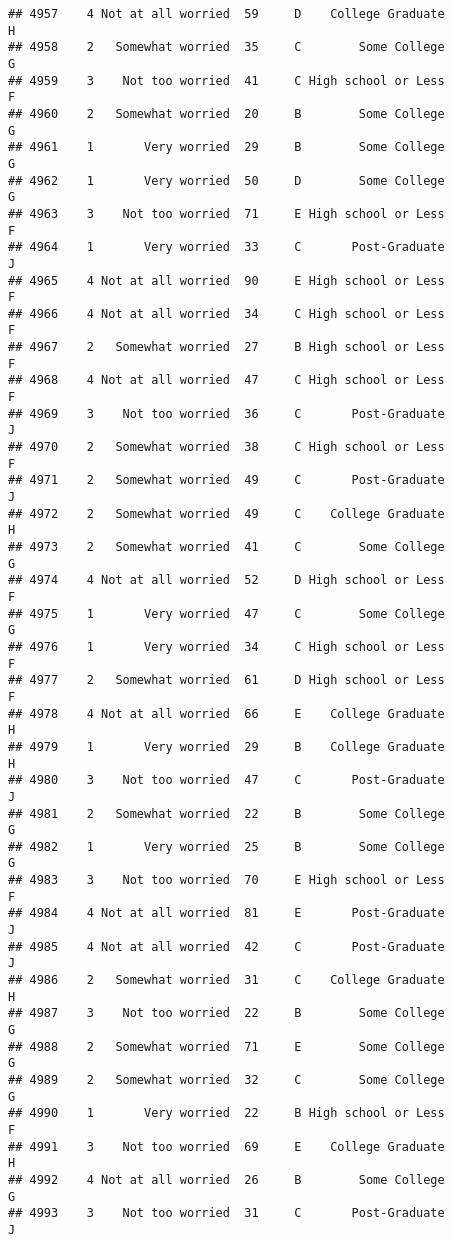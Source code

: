 \documentclass[
]{article}
\begin{document}
\begin{verbatim}
## 4957    4 Not at all worried  59     D    College Graduate         H
## 4958    2   Somewhat worried  35     C        Some College         G
## 4959    3    Not too worried  41     C High school or Less         F
## 4960    2   Somewhat worried  20     B        Some College         G
## 4961    1       Very worried  29     B        Some College         G
## 4962    1       Very worried  50     D        Some College         G
## 4963    3    Not too worried  71     E High school or Less         F
## 4964    1       Very worried  33     C       Post-Graduate         J
## 4965    4 Not at all worried  90     E High school or Less         F
## 4966    4 Not at all worried  34     C High school or Less         F
## 4967    2   Somewhat worried  27     B High school or Less         F
## 4968    4 Not at all worried  47     C High school or Less         F
## 4969    3    Not too worried  36     C       Post-Graduate         J
## 4970    2   Somewhat worried  38     C High school or Less         F
## 4971    2   Somewhat worried  49     C       Post-Graduate         J
## 4972    2   Somewhat worried  49     C    College Graduate         H
## 4973    2   Somewhat worried  41     C        Some College         G
## 4974    4 Not at all worried  52     D High school or Less         F
## 4975    1       Very worried  47     C        Some College         G
## 4976    1       Very worried  34     C High school or Less         F
## 4977    2   Somewhat worried  61     D High school or Less         F
## 4978    4 Not at all worried  66     E    College Graduate         H
## 4979    1       Very worried  29     B    College Graduate         H
## 4980    3    Not too worried  47     C       Post-Graduate         J
## 4981    2   Somewhat worried  22     B        Some College         G
## 4982    1       Very worried  25     B        Some College         G
## 4983    3    Not too worried  70     E High school or Less         F
## 4984    4 Not at all worried  81     E       Post-Graduate         J
## 4985    4 Not at all worried  42     C       Post-Graduate         J
## 4986    2   Somewhat worried  31     C    College Graduate         H
## 4987    3    Not too worried  22     B        Some College         G
## 4988    2   Somewhat worried  71     E        Some College         G
## 4989    2   Somewhat worried  32     C        Some College         G
## 4990    1       Very worried  22     B High school or Less         F
## 4991    3    Not too worried  69     E    College Graduate         H
## 4992    4 Not at all worried  26     B        Some College         G
## 4993    3    Not too worried  31     C       Post-Graduate         J

\end{verbatim}
\end{document}
